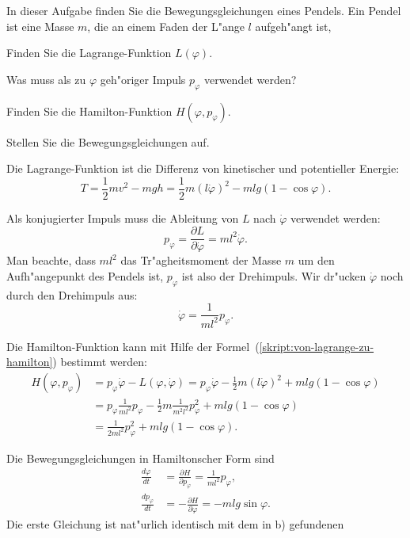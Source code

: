 In dieser Aufgabe finden Sie die Bewegungsgleichungen eines Pendels.
Ein Pendel ist eine Masse $m$, die an einem Faden der L"ange $l$ 
aufgeh"angt ist, 

\begin{teilaufgaben}
\item Finden Sie die Lagrange-Funktion $L(\varphi)$.
\item Was muss als zu $\varphi$ geh"origer Impuls $p_\varphi$ verwendet werden?
\item Finden Sie die Hamilton-Funktion $H(\varphi, p_\varphi)$.
\item Stellen Sie die Bewegungsgleichungen auf.
\end{teilaufgaben}

\begin{loesung}
\begin{teilaufgaben}
\item Die Lagrange-Funktion ist die Differenz von kinetischer und
potentieller Energie:
\[
T
=
\frac12mv^2-mgh
=
\frac12m(l\dot\varphi)^2-mlg(1-\cos\varphi).
\]
\item
Als konjugierter Impuls muss die Ableitung von $L$ nach $\dot\varphi$
verwendet werden:
\[
p_\varphi
=
\frac{\partial L}{\partial\dot\varphi}
=
ml^2\dot\varphi.
\]
Man beachte, dass $ml^2$ das Tr"agheitsmoment der Masse $m$ um den
Aufh"angepunkt des Pendels ist, $p_\varphi$ ist also der Drehimpuls.
Wir dr"ucken $\dot\varphi$ noch durch den Drehimpuls aus:
\[
\dot\varphi
=
\frac{1}{ml^2}p_{\varphi}.
\]
\item
Die Hamilton-Funktion kann mit Hilfe der
Formel~(\ref{skript:von-lagrange-zu-hamilton})
bestimmt werden:
\begin{align*}
H(\varphi,p_\varphi)
&=
p_\varphi\dot\varphi-L(\varphi,\dot\varphi)
=
p_\varphi\dot\varphi - \frac12 m(l\dot\varphi)^2+mlg(1-\cos\varphi)
\\
&=
p_\varphi\frac{1}{ml^2}p_\varphi-\frac12m\frac{1}{m^2l^2}p_\varphi^2
+mlg(1-\cos\varphi)
\\
&=
\frac1{2ml^2}p_\varphi^2 + mlg(1-\cos\varphi).
\end{align*}
\item
Die Bewegungsgleichungen in Hamiltonscher Form sind
\begin{align*}
\frac{d\varphi}{dt}
&=
\frac{\partial H}{\partial p_\varphi}
=
\frac{1}{ml^2}p_\varphi,
\\
\frac{dp_\varphi}{dt}
&=
-\frac{\partial H}{\partial\varphi}
=
-mlg\sin\varphi.
\end{align*}
Die erste Gleichung ist nat"urlich identisch mit dem in b) gefundenen

\end{teilaufgaben}
\end{loesung}
